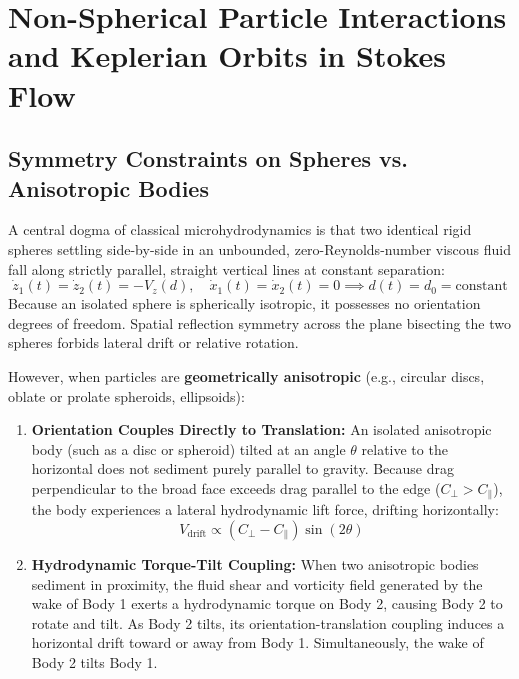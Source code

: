 \documentclass[11pt,a4paper]{article}
\begin{document}
\section{Non-Spherical Particle Interactions and Keplerian Orbits in Stokes Flow}

\subsection{Symmetry Constraints on Spheres vs. Anisotropic Bodies}
A central dogma of classical microhydrodynamics is that two identical rigid spheres settling side-by-side in an unbounded, zero-Reynolds-number viscous fluid fall along strictly parallel, straight vertical lines at constant separation:
\begin{equation}
    \dot{z}_1(t) = \dot{z}_2(t) = -V_z(d), \quad \dot{x}_1(t) = \dot{x}_2(t) = 0 \implies d(t) = d_0 = \text{constant}
\end{equation}
Because an isolated sphere is spherically isotropic, it possesses no orientation degrees of freedom. Spatial reflection symmetry across the plane bisecting the two spheres forbids lateral drift or relative rotation.

However, when particles are \textbf{geometrically anisotropic} (e.g., circular discs, oblate or prolate spheroids, ellipsoids):
\begin{enumerate}
    \item \textbf{Orientation Couples Directly to Translation:} An isolated anisotropic body (such as a disc or spheroid) tilted at an angle $\theta$ relative to the horizontal does not sediment purely parallel to gravity. Because drag perpendicular to the broad face exceeds drag parallel to the edge ($C_{\perp} > C_{\parallel}$), the body experiences a lateral hydrodynamic lift force, drifting horizontally:
    \begin{equation}
        V_{\text{drift}} \propto (C_{\perp} - C_{\parallel}) \sin(2\theta)
    \end{equation}
    \item \textbf{Hydrodynamic Torque-Tilt Coupling:} When two anisotropic bodies sediment in proximity, the fluid shear and vorticity field generated by the wake of Body 1 exerts a hydrodynamic torque on Body 2, causing Body 2 to rotate and tilt. As Body 2 tilts, its orientation-translation coupling induces a horizontal drift toward or away from Body 1. Simultaneously, the wake of Body 2 tilts Body 1.
\end{enumerate}
\end{document}
